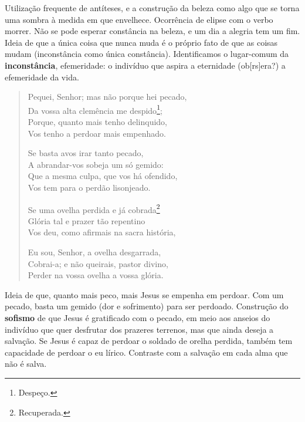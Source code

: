 Utilização frequente de antíteses, e a construção da beleza como algo que se torna uma sombra à medida em que envelhece. Ocorrência de elipse com o verbo morrer. Não se pode esperar constância na beleza, e um dia a alegria tem um fim. Ideia de que a única coisa que nunca muda é o próprio fato de que as coisas mudam (inconstância como única constância). Identificamos o lugar-comum da \textbf{inconstância}, efemeridade: o indivíduo que aspira a eternidade (ob[rs]era?) a efemeridade da vida.

\begin{verse}
Pequei, Senhor; mas não porque hei pecado, \\
Da vossa alta clemência me despido\footnote{Despeço.}; \\
Porque, quanto mais tenho delinquido, \\
Vos tenho a perdoar mais empenhado.
				
Se basta avos irar tanto pecado, \\
A abrandar-vos sobeja um só gemido: \\
Que a mesma culpa, que vos há ofendido, \\
Vos tem para o perdão lisonjeado.
				
Se uma ovelha perdida e já cobrada\footnote{Recuperada.} \\
Glória tal e prazer tão repentino \\
Vos deu, como afirmais na sacra história, 
				
Eu sou, Senhor, a ovelha desgarrada, \\
Cobrai-a; e não queirais, pastor divino, \\
Perder na vossa ovelha a vossa glória. \\
\end{verse}

Ideia de que, quanto mais peco, mais Jesus se empenha em perdoar. Com um pecado, basta um gemido (dor e sofrimento) para ser perdoado. Construção do \textbf{sofismo} de que Jesus é gratificado com o pecado, em meio aos anseios do indivíduo que quer desfrutar dos prazeres terrenos, mas que ainda deseja a salvação. Se Jesus é capaz de perdoar o soldado de orelha perdida, também tem capacidade de perdoar o eu lírico. Contraste com a salvação em cada alma que não é salva.

